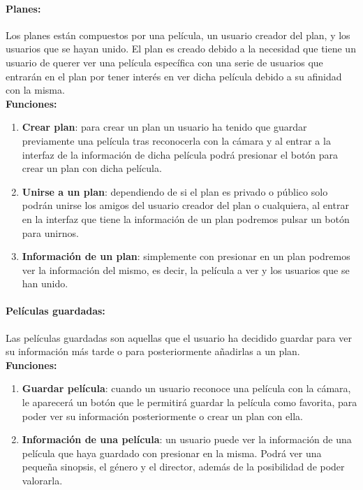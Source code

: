 \paragraph{\large Planes:\\}

Los planes están compuestos por una película, un usuario creador del plan, y los usuarios que se hayan unido. El plan
es creado debido a la necesidad que tiene un usuario de querer ver una película específica con una serie de usuarios que 
entrarán en el plan por tener interés en ver dicha película debido a su afinidad con la misma.
\\
\textbf{Funciones:}
\begin{enumerate}
    \item \textbf{Crear plan}: para crear un plan un usuario ha tenido que guardar previamente una película tras reconocerla con la cámara y al entrar a la interfaz de la información de dicha película podrá presionar el botón para crear un plan con dicha película.
    \item \textbf{Unirse a un plan}: dependiendo de si el plan es privado o público solo podrán unirse los amigos del usuario creador del plan o cualquiera, al entrar en la interfaz que tiene la información de un plan podremos pulsar un botón para unirnos.
    \item \textbf{Información de un plan}: simplemente con presionar en un plan podremos ver la información del mismo, es decir, la película a ver y los usuarios que se han unido.
\end{enumerate}
\newpage
\paragraph{\large Películas guardadas:\\}

Las películas guardadas son aquellas que el usuario ha decidido guardar para ver su información más tarde o para posteriormente añadirlas a un plan.
\\
\textbf{Funciones:}
\begin{enumerate}
    \item \textbf{Guardar película}: cuando un usuario reconoce una película con la cámara, le aparecerá un botón que le permitirá guardar la película como favorita, para poder ver su información posteriormente o crear un plan con ella.
    \item \textbf{Información de una película}: un usuario puede ver la información de una película que haya guardado con presionar en la misma. Podrá ver una pequeña sinopsis, el género y el director, además de la posibilidad de poder valorarla.
\end{enumerate} 

